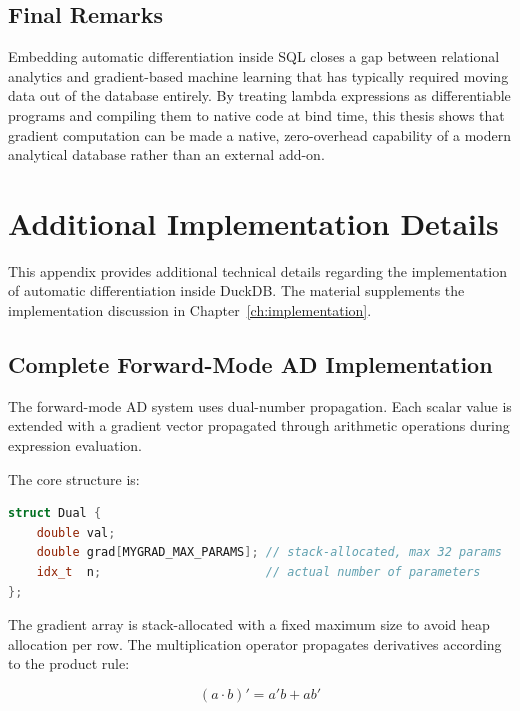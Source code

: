 \documentclass[12pt]{report}
\begin{document}
\section{Final Remarks}
Embedding automatic differentiation inside SQL closes a gap between
relational analytics and gradient-based machine learning that has
typically required moving data out of the database entirely. By treating
lambda expressions as differentiable programs and compiling them to
native code at bind time, this thesis shows that gradient computation can
be made a native, zero-overhead capability of a modern analytical
database rather than an external add-on.


\appendix


\chapter{Additional Implementation Details}
\label{app:implementation}

This appendix provides additional technical details regarding the
implementation of automatic differentiation inside DuckDB. The material
supplements the implementation discussion in Chapter~\ref{ch:implementation}.

\section{Complete Forward-Mode AD Implementation}

The forward-mode AD system uses dual-number propagation. Each scalar value
is extended with a gradient vector propagated through arithmetic operations
during expression evaluation.

The core structure is:

\begin{lstlisting}[language=C++]
struct Dual {
    double val;
    double grad[MYGRAD_MAX_PARAMS]; // stack-allocated, max 32 params
    idx_t  n;                       // actual number of parameters
};
\end{lstlisting}

The gradient array is stack-allocated with a fixed maximum size to avoid
heap allocation per row. The multiplication operator propagates derivatives
according to the product rule:

\begin{equation}
(a \cdot b)' = a'b + ab'
\end{equation}
\end{document}

